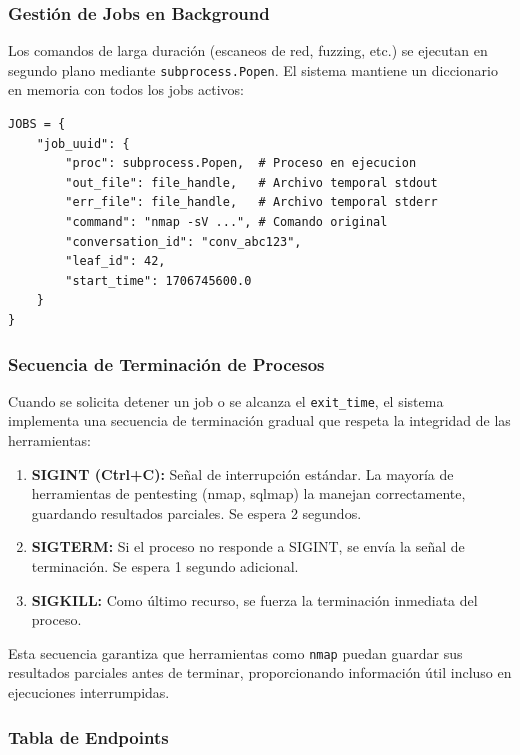 \subsubsection{Gestión de Jobs en Background}

Los comandos de larga duración (escaneos de red, fuzzing, etc.) se ejecutan en segundo plano mediante \texttt{subprocess.Popen}. El sistema mantiene un diccionario en memoria con todos los jobs activos:

\begin{verbatim}
JOBS = {
    "job_uuid": {
        "proc": subprocess.Popen,  # Proceso en ejecucion
        "out_file": file_handle,   # Archivo temporal stdout
        "err_file": file_handle,   # Archivo temporal stderr
        "command": "nmap -sV ...", # Comando original
        "conversation_id": "conv_abc123",
        "leaf_id": 42,
        "start_time": 1706745600.0
    }
}
\end{verbatim}

\subsubsection{Secuencia de Terminación de Procesos}

Cuando se solicita detener un job o se alcanza el \texttt{exit\_time}, el sistema implementa una secuencia de terminación gradual que respeta la integridad de las herramientas:

\begin{enumerate}
    \item \textbf{SIGINT (Ctrl+C):} Señal de interrupción estándar. La mayoría de herramientas de pentesting (nmap, sqlmap) la manejan correctamente, guardando resultados parciales. Se espera 2 segundos.
    \item \textbf{SIGTERM:} Si el proceso no responde a SIGINT, se envía la señal de terminación. Se espera 1 segundo adicional.
    \item \textbf{SIGKILL:} Como último recurso, se fuerza la terminación inmediata del proceso.
\end{enumerate}

Esta secuencia garantiza que herramientas como \texttt{nmap} puedan guardar sus resultados parciales antes de terminar, proporcionando información útil incluso en ejecuciones interrumpidas.

\subsubsection{Tabla de Endpoints}

